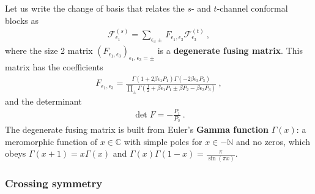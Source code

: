\documentclass[12pt, a4paper]{article}
\newcommand{\myindex}[1]{\textbf{\boldmath #1}}
\begin{document}
Let us write 
the change of basis that relates the $s$- and $t$-channel conformal blocks as 
\begin{align}
 \mathcal{F}^{(s)}_{\epsilon_1} = \sum_{\epsilon_3\pm} F_{\epsilon_1,\epsilon_3} \mathcal{F}^{(t)}_{\epsilon_3}\ , 
 \label{fsfft}
\end{align}
where the size 2 matrix $\left(F_{\epsilon_1,\epsilon_3}\right)_{\epsilon_1,\epsilon_3=\pm}$ is a \myindex{degenerate fusing matrix}. This matrix has the coefficients 
\begin{align}
 \boxed{F_{\epsilon_1,\epsilon_3} = \frac{\Gamma(1+2\beta\epsilon_1P_1)\Gamma(-2\beta \epsilon_3P_3)}{\prod_\pm \Gamma(\frac12 +\beta \epsilon_1P_1 \pm \beta P_2 -\beta \epsilon_3P_3)}}\ ,
 \label{fee}
\end{align}
and the determinant 
\begin{align}
 \det F = -\frac{P_1}{P_3}\ .
 \label{detf}
\end{align}
The degenerate fusing matrix is built from Euler's \myindex{Gamma function} $\Gamma(x)$: a meromorphic function of $x\in\mathbb{C}$ with simple poles for $x\in -\mathbb{N}$ and no zeros, which obeys $\Gamma(x+1)=x\Gamma(x)$ and $\Gamma(x)\Gamma(1-x)=\frac{\pi}{\sin(\pi x)}$. 

\subsubsection{Crossing symmetry}
\end{document}
